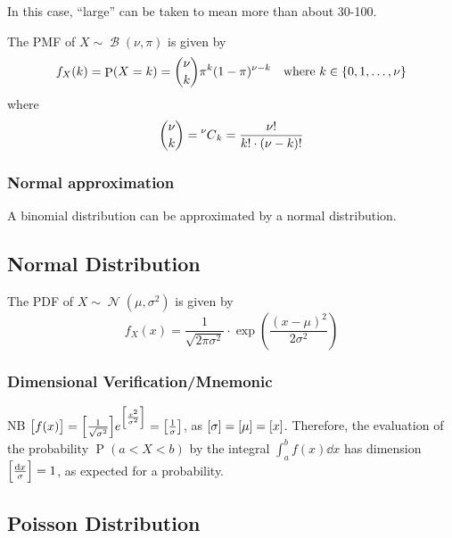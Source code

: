 \documentclass[fleqn,a4paper,11pt]{article}
\DeclareMathOperator{\Normal}{\mathcal{N}}
\DeclareMathOperator{\Binomial}{\mathcal{B}}
\DeclareMathOperator{\Prob}{\mathrm P}
\newcommand*\nCr[2]{\prescript{#1\mkern-0.5mu}{}C_{#2}}
\begin{document}
    In this case, ``large'' can be taken to mean more than about 30-100.

    The PMF of \(X \sim \Binomial(\nu, \pi)\) is given by
    \begin{equation*}
    f_X(k) = \Prob(X = k) = \binom \nu k \pi^k (1 - \pi)^{\nu - k}
        \quad \text{where \(k \in \set{0, 1, \dotsc, \nu}\)}
    \end{equation*}
    where
    \begin{equation*}
    \binom \nu k = \nCr \nu k = \frac{\nu!}{k!\cdot (\nu - k)!}
    \end{equation*}

    \subsubsection{Normal approximation}

    A binomial distribution can be approximated by a normal distribution.

    \subsection{Normal Distribution}


    The PDF of \(X \sim \Normal(\mu, \sigma^2)\) is given by
    \begin{equation*}
    f_X(x) = \frac{1}{\sqrt{2\pi\sigma^2}} \cdot
        \exp(\frac{(x - \mu)^2}{2\sigma^2})
    \end{equation*}

    \subsubsection{Dimensional Verification/Mnemonic}

    NB \(\bqty{f(x)} =
        \bqty{\frac 1{\sqrt{\sigma^2}}}
        e^{\bqty{\frac{x^2}{\sigma^2}}}
      = \bqty{\frac 1\sigma}\), as
    \(\bqty{\sigma} = \bqty{\mu} = \bqty{x}\). Therefore, the
    evaluation of the probability \(\Prob(a < X < b)\) by the integral
    \(\int_a^bf(x) \dd{x}\) has dimension
    \(\bqty{\frac{\dd{x}}{\sigma}} = 1\), as expected for a probability.

    \subsection{Poisson Distribution}

\end{document}
